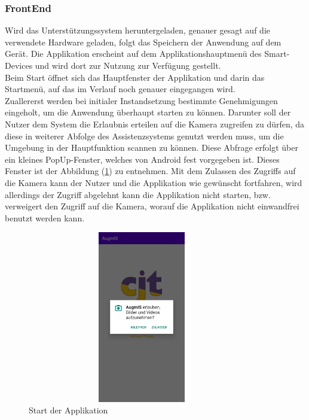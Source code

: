 \subsubsection{FrontEnd}
Wird das Unterstützungssystem heruntergeladen, genauer gesagt auf die verwendete Hardware geladen, folgt das Speichern der Anwendung auf dem Gerät. Die Applikation 
erscheint auf dem Applikationshauptmenü des Smart-Devices und wird dort zur Nutzung zur Verfügung gestellt. 
\\ 
Beim Start öffnet sich das Hauptfenster der Applikation und darin das Startmenü, auf das im Verlauf noch genauer eingegangen wird. 
\\ 
Zuallererst werden bei initialer Instandsetzung bestimmte Genehmigungen eingeholt, um die Anwendung überhaupt starten zu können. Darunter soll der Nutzer dem System 
die Erlaubnis erteilen auf die Kamera zugreifen zu dürfen, da diese in weiterer Abfolge des Assistenzsystems genutzt werden muss, um die Umgebung in der Hauptfunktion 
scannen zu können. Diese Abfrage erfolgt über ein kleines PopUp-Fenster, welches von Android fest vorgegeben ist. Dieses Fenster ist der Abbildung (\ref{pic:camera_perm}) 
zu entnehmen. Mit dem Zulassen des Zugriffs auf die Kamera kann der Nutzer und die Applikation wie gewünscht fortfahren, wird allerdings der Zugriff abgelehnt kann 
die Applikation nicht starten, bzw. verweigert den Zugriff auf die Kamera, worauf die Applikation nicht einwandfrei benutzt werden kann.     
\begin{figure}[hbt!]
    \centering
    \includegraphics[width=10cm,height=7.5cm,keepaspectratio]{4Umsetzung/Bilder/camera_permission.jpg}
    \caption{Start der Applikation}
    \label{pic:camera_perm}
\end{figure}
\\ 
\linebreak

